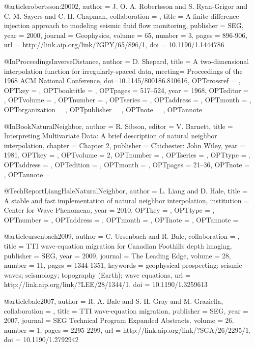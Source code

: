 @article{robertsson:20002,
author = {J. O. A. Robertsson and S. Ryan-Grigor and C. M. Sayers and C. H. Chapman},
collaboration = {},
title = {A finite-difference injection approach to modeling seismic fluid flow monitoring},
publisher = {SEG},
year = {2000},
journal = {Geophysics},
volume = {65},
number = {3},
pages = {896-906},
url = {http://link.aip.org/link/?GPY/65/896/1},
doi = {10.1190/1.1444786}
}

@InProceedings{InverseDistance,
  author = 	 {D. Shepard},
  title = 	 {A two-dimensional interpolation function for
                  irregularly-spaced data},
  meeting= {Proceedings of the 1968 ACM National Conference},
  doi={10.1145/800186.810616},
  OPTcrossref =  {},
  OPTkey = 	 {},
  OPTbooktitle = {},
  OPTpages = 	 {517–524},
  year = 	 {1968},
  OPTeditor = 	 {},
  OPTvolume = 	 {},
  OPTnumber = 	 {},
  OPTseries = 	 {},
  OPTaddress = 	 {},
  OPTmonth = 	 {},
  OPTorganization = {},
  OPTpublisher = {},
  OPTnote = 	 {},
  OPTannote = 	 {}
}

@InBook{NaturalNeighbor,
  author = 	 {R. Sibson},
  editor = 	 {V. Barnett},
  title = 	 {Interpreting Multivariate Data: A brief description of natural neighbor interpolation},
  chapter = 	 {Chapter 2},
  publisher = 	 {Chichester: John Wiley},
  year = 	 {1981},
  OPTkey = 	 {},
  OPTvolume = 	 {2},
  OPTnumber = 	 {},
  OPTseries = 	 {},
  OPTtype = 	 {},
  OPTaddress = 	 {},
  OPTedition = 	 {},
  OPTmonth = 	 {},
  OPTpages = 	 {21–36},
  OPTnote = 	 {},
  OPTannote = 	 {}
}

@TechReport{LiangHaleNaturalNeighbor,
  author = 	 {L. Liang and D. Hale},
  title = 	 {A stable and fast implementation of natural neighbor
                  interpolation},
  institution =  {Center for Wave Phenomena},
  year = 	 {2010},
  OPTkey = 	 {},
  OPTtype = 	 {},
  OPTnumber = 	 {},
  OPTaddress = 	 {},
  OPTmonth = 	 {},
  OPTnote = 	 {},
  OPTannote = 	 {}
}


@article{ursenbach2009,
author = {C. Ursenbach and R. Bale},
collaboration = {},
title = {TTI wave-equation migration for Canadian Foothills depth imaging},
publisher = {SEG},
year = {2009},
journal = {The Leading Edge},
volume = {28},
number = {11},
pages = {1344-1351},
keywords = {geophysical prospecting; seismic waves; seismology; topography (Earth); wave equations},
url = {http://link.aip.org/link/?LEE/28/1344/1},
doi = {10.1190/1.3259613}
}

@article{bale2007,
author = {R. A. Bale and S. H. Gray and M. Graziella},
collaboration = {},
title = {TTI wave-equation migration},
publisher = {SEG},
year = {2007},
journal = {SEG Technical Program Expanded Abstracts},
volume = {26},
number = {1},
pages = {2295-2299},
url = {http://link.aip.org/link/?SGA/26/2295/1},
doi = {10.1190/1.2792942}
}


